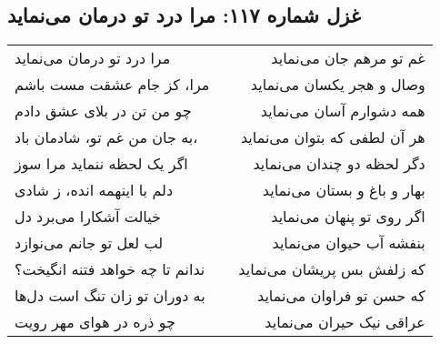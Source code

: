 \begin{center}
\section*{غزل شماره ۱۱۷: مرا درد تو درمان می‌نماید}
\label{sec:117}
\begin{longtable}{l p{0.5cm} r}
مرا درد تو درمان می‌نماید
&&
غم تو مرهم جان می‌نماید
\\
مرا، کز جام عشقت مست باشم
&&
وصال و هجر یکسان می‌نماید
\\
چو من تن در بلای عشق دادم
&&
همه دشوارم آسان می‌نماید
\\
به جان من غم تو، شادمان باد،
&&
هر آن لطفی که بتوان می‌نماید
\\
اگر یک لحظه ننماید مرا سوز
&&
دگر لحظه دو چندان می‌نماید
\\
دلم با اینهمه انده، ز شادی
&&
بهار و باغ و بستان می‌نماید
\\
خیالت آشکارا می‌برد دل
&&
اگر روی تو پنهان می‌نماید
\\
لب لعل تو جانم می‌نوازد
&&
بنفشه آب حیوان می‌نماید
\\
ندانم تا چه خواهد فتنه انگیخت؟
&&
که زلفش بس پریشان می‌نماید
\\
به دوران تو زان تنگ است دل‌ها
&&
که حسن تو فراوان می‌نماید
\\
چو ذره در هوای مهر رویت
&&
عراقی نیک حیران می‌نماید
\\
\end{longtable}
\end{center}
